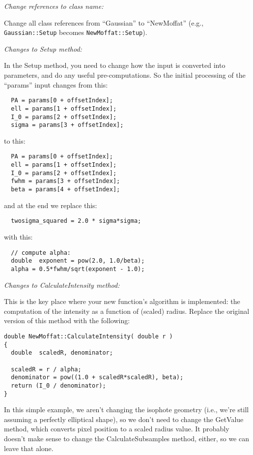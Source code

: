 \documentclass[10pt]{article}
\begin{document}
\bigskip
\noindent \textit{Change references to class name:}
\smallskip

Change all class references from ``Gaussian'' to ``NewMoffat'' (e.g., \texttt{Gaussian::Setup}
becomes \texttt{NewMoffat::Setup}).

\bigskip
\noindent \textit{Changes to Setup method:}
\smallskip

In the Setup method, you need to change how the input is converted into
parameters, and do any useful pre-computations. So the initial processing of
the ``params'' input changes from this:
\begin{verbatim}
  PA = params[0 + offsetIndex];
  ell = params[1 + offsetIndex];
  I_0 = params[2 + offsetIndex];
  sigma = params[3 + offsetIndex];
\end{verbatim}

to this:
\begin{verbatim}
  PA = params[0 + offsetIndex];
  ell = params[1 + offsetIndex];
  I_0 = params[2 + offsetIndex];
  fwhm = params[3 + offsetIndex];
  beta = params[4 + offsetIndex];
\end{verbatim}
and at the end we replace this:
\begin{verbatim}
  twosigma_squared = 2.0 * sigma*sigma;
\end{verbatim}
with this:
\begin{verbatim}
  // compute alpha:
  double  exponent = pow(2.0, 1.0/beta);
  alpha = 0.5*fwhm/sqrt(exponent - 1.0);
\end{verbatim}


\bigskip
\noindent \textit{Changes to CalculateIntensity method:}
\smallskip

This is the key place where your new function's algorithm is
implemented: the computation of the intensity as a function of (scaled)
radius.  Replace the original version of this method with the following:
\begin{verbatim}
double NewMoffat::CalculateIntensity( double r )
{
  double  scaledR, denominator;
  
  scaledR = r / alpha;
  denominator = pow((1.0 + scaledR*scaledR), beta);
  return (I_0 / denominator);
}
\end{verbatim}

\bigskip

In this simple example, we aren't changing the isophote geometry (i.e.,
we're still assuming a perfectly elliptical shape), so we don't need to
change the GetValue method, which converts pixel position to a scaled
radius value.  It probably doesn't make sense to change the
CalculateSubsamples method, either, so we can leave that alone.
\end{document}
